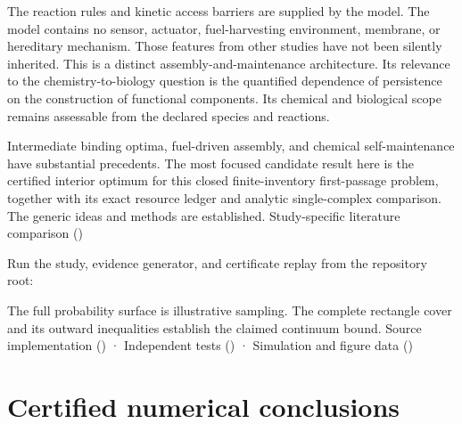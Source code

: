 \documentclass[
  11pt,
]{article}
\newenvironment{Shaded}{}{}
\newcommand{\FunctionTok}[1]{\textcolor[rgb]{0.02,0.16,0.49}{#1}}
\newcommand{\NormalTok}[1]{#1}
\newcommand{\OperatorTok}[1]{\textcolor[rgb]{0.40,0.40,0.40}{#1}}
\newcommand{\StringTok}[1]{\textcolor[rgb]{0.25,0.44,0.63}{#1}}
\newcommand{\VariableTok}[1]{\textcolor[rgb]{0.10,0.09,0.49}{#1}}
\begin{document}
The reaction rules and kinetic access barriers are supplied by the
model. The model contains no sensor, actuator, fuel-harvesting
environment, membrane, or hereditary mechanism. Those features from
other studies have not been silently inherited. This is a distinct
assembly-and-maintenance architecture. Its relevance to the
chemistry-to-biology question is the quantified dependence of
persistence on the construction of functional components. Its chemical
and biological scope remains assessable from the declared species and
reactions.

Intermediate binding optima, fuel-driven assembly, and chemical
self-maintenance have substantial precedents. The most focused candidate
result here is the certified interior optimum for this closed
finite-inventory first-passage problem, together with its exact resource
ledger and analytic single-complex comparison. The generic ideas and
methods are established. Study-specific literature comparison
()

Run the study, evidence generator, and certificate replay from the
repository root:

\begin{Shaded}
\end{Shaded}

The full probability surface is illustrative sampling. The complete
rectangle cover and its outward inequalities establish the claimed
continuum bound. Source implementation
() · Independent tests
() · Simulation and figure data
()

\section{Certified numerical
conclusions}\label{certified-numerical-conclusions}
\end{document}
